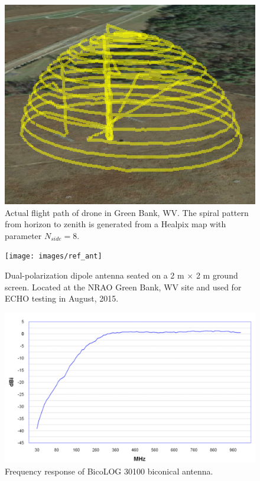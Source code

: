 \documentclass[preprint2]{aastex}
\begin{document}
\begin{center}
\begin{figure}[h]
\centering
\includegraphics[scale=0.7]{images/flight_path.png}
\caption{Actual flight path of drone in Green Bank, WV.  The spiral pattern from horizon to zenith is generated from a Healpix map with parameter $N_{side}=8$.}
\label{fig:flight path}
\end{figure}

\begin{figure}[h]
\centering
\texttt{[image: images/ref\_ant]}
\caption{Dual-polarization dipole antenna seated on a 2 m $\times$ 2 m ground screen.  Located at the NRAO Green Bank, WV site and used for ECHO testing in August, 2015.}
\label{fig:dual dipole}
\end{figure}

\end{center}

\iffalse
\begin{figure}[h]
\centering
\includegraphics[scale=0.5]{images/bicolog_frequency_response.png}
\caption{Frequency response of BicoLOG 30100 biconical antenna.}
\label{BicoLOG response}
\end{figure}
\end{document}
